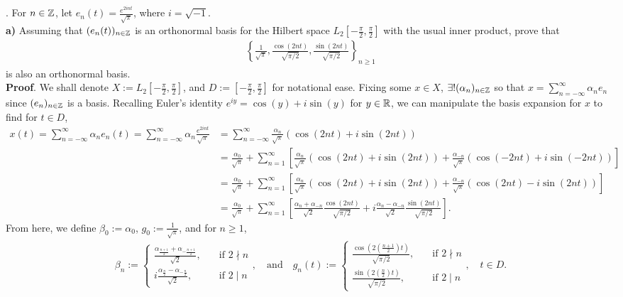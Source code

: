 \documentclass[10pt]{article}
\newcommand{\1}[1]{\mathbbm{1}_{#1}} \newcommand{\mc}[1]{\mathcal{#1}}
\begin{document}
    . For $n\in\mathbb{Z}$, let $e_n(t)=\frac{e^{2int}}{\sqrt{\pi}}$, where $i=\sqrt{-1}$.\\[5pt]
    {\bf a)} Assuming that $(e_n(t))_{n\in\mathbb{Z}}$ is an orthonormal basis for the Hilbert space $L_2\left[-\frac{\pi}{2},\frac{\pi}{2}\right]$ with the usual inner product, prove that
    \begin{align*}
        \left\{\frac{1}{\sqrt{\pi}},\frac{\cos(2nt)}{\sqrt{\pi/2}},\frac{\sin(2nt)}{\sqrt{\pi/2}}\right\}_{n\geq 1}
    \end{align*}
    is also an orthonormal basis.\\[5pt]
    {\bf Proof}. We shall denote $X:=L_2\left[-\frac{\pi}{2},\frac{\pi}{2}\right]$, and $D:=\left[-\frac{\pi}{2},\frac{\pi}{2}\right]$ for notational ease. Fixing some $x\in X$, $\exists!(\alpha_n)_{n\in\mathbb{Z}}$ so that $x=\sum_{n=-\infty}^{\infty}\alpha_ne_n$ since $(e_n)_{n\in\mathbb{Z}}$ is a basis. 
    Recalling Euler's identity $e^{iy}=\cos(y)+i\sin(y)$ for $y\in\mathbb{R}$, we can manipulate the basis expansion for $x$ to find for $t\in D$,
    \begin{align*}
        x(t)=\sum_{n=-\infty}^\infty\alpha_ne_n(t)=\sum_{n=-\infty}^\infty\alpha_n\frac{e^{2int}}{\sqrt{\pi}}&=\sum_{n=-\infty}^\infty\frac{\alpha_n}{\sqrt{\pi}}(\cos(2nt)+i\sin(2nt))\\
        &=\frac{\alpha_0}{\sqrt{\pi}}+\sum_{n=1}^\infty\left[\frac{\alpha_n}{\sqrt{\pi}}(\cos(2nt)+i\sin(2nt))+\frac{\alpha_{-n}}{\sqrt{\pi}}(\cos(-2nt)+i\sin(-2nt))\right]\\
        &=\frac{\alpha_0}{\sqrt{\pi}}+\sum_{n=1}^\infty\left[\frac{\alpha_n}{\sqrt{\pi}}(\cos(2nt)+i\sin(2nt))+\frac{\alpha_{-n}}{\sqrt{\pi}}(\cos(2nt)-i\sin(2nt))\right]\\
        &=\frac{\alpha_0}{\sqrt{\pi}}+\sum_{n=1}^\infty\left[\frac{\alpha_n+\alpha_{-n}}{\sqrt{2}}\frac{\cos(2nt)}{\sqrt{\pi/2}}+i\frac{\alpha_n-\alpha_{-n}}{\sqrt{2}}\frac{\sin(2nt)}{\sqrt{\pi/2}}\right].
    \end{align*}
    From here, we define $\beta_0:=\alpha_0$, $g_0:=\frac{1}{\sqrt{\pi}}$, and for $n\geq 1$,
    \begin{align*}
        \beta_n:=\begin{cases}
            \frac{\alpha_{\frac{n+1}{2}}+\alpha_{-\frac{n+1}{2}}}{\sqrt{2}},\quad&\text{if $2\nmid n$}\\
            i\frac{\alpha_{\frac{n}{2}}-\alpha_{-\frac{n}{2}}}{\sqrt{2}},\quad&\text{if $2\mid n$}
        \end{cases},\quad\text{and}\quad g_n(t):=\begin{cases}
            \frac{\cos(2(\frac{n+1}{2})t)}{\sqrt{\pi/2}},\quad&\text{if $2\nmid n$}\\
            \frac{\sin(2(\frac{n}{2})t)}{\sqrt{\pi/2}},\quad&\text{if $2\mid n$}
        \end{cases},\quad t\in D.
    \end{align*}
\end{document}
